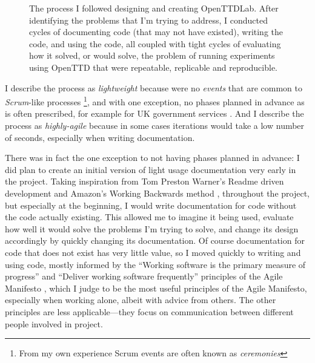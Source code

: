 \documentclass[logo,msc,dsti]{style/infthesis}    %
\begin{document}
{\begin{figure}[ht]
\caption{The process I followed designing and creating OpenTTDLab. After identifying the problems that I'm trying to address, I conducted cycles of documenting code (that may not have existed), writing the code, and using the code, all coupled with tight cycles of evaluating how it solved, or would solve, the problem of running experiments using OpenTTD that were repeatable, replicable and reproducible.}
\label{fig:solo-agile}
\end{figure}
%
I describe the process as \emph{lightweight} because were no \emph{events} that are common to \emph{Scrum}-like processes \cite{SCRUM}\footnote{From my own experience Scrum events are often known as \emph{ceremonies}}, and with one exception, no phases planned in advance as is often prescribed, for example for UK government services \cite{GOVUKAgile}. And I describe the process as \emph{highly-agile} because in some cases iterations would take a low number of seconds, especially when writing documentation.

There was in fact the one exception to not having phases planned in advance: I did plan to create an initial version of light usage documentation very early in the project. Taking inspiration from Tom Preston Warner's Readme driven development \cite{ReadmeDrivenDevelopment} and Amazon's Working Backwards method \cite{bryar2021working}, throughout the project, but especially at the beginning, I would write documentation for code without the code actually existing. This allowed me to imagine it being used, evaluate how well it would solve the problems I'm trying to solve, and change its design accordingly by quickly changing its documentation. Of course documentation for code that does not exist has very little value, so I moved quickly to writing and using code, mostly informed by the ``Working software is the primary measure of progress'' and ``Deliver working software frequently'' principles of the Agile Manifesto \cite{beck2001manifesto}, which I judge to be the most useful principles of the Agile Manifesto, especially when working alone, albeit with advice from others. The other principles are less applicable---they focus on communication between different people involved in project.

}
\end{document}
